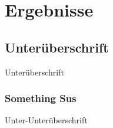 
\chapter{Ergebnisse}\label{ch:ergebnisse}

\section{Unterüberschrift}
    Unterüberschrift

    \subsection{Something Sus} %
        Unter-Unterüberschrift